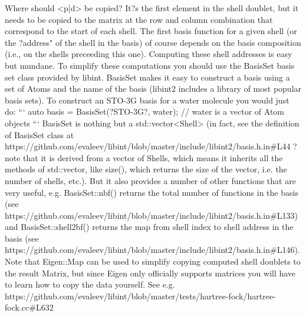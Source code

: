 \documentclass[11pt, oneside]{article}   	%
\begin{document}
Where should <p|d> be copied? It?s the first element in the shell doublet, but it needs to be copied to the matrix at the row and column combination that correspond to the start of each shell. The first basis function for a given shell (or the ?address" of the shell in the basis) of course depends on the basis composition (i.e., on the shells preceeding this one). Computing these shell addresses is easy but mundane. To simplify these computations you should use the BasisSet basis set class provided by libint.
BasisSet makes it easy to construct a basis using a set of Atoms and the name of the basis (libint2 includes a library of most popular basis sets). To construct an STO-3G basis for a water molecule you would just do:
```
auto basis = BasisSet(?STO-3G?, water);  // water is a vector of Atom objects
```
BasisSet is nothing but a std::vector<Shell> (in fact, see the definition of BasisSet class at https://github.com/evaleev/libint/blob/master/include/libint2/basis.h.in\#L44  ? note that it is derived from a vector of Shells, which means it inherits all the methods of std::vector, like size(), which returns the size of the vector, i.e. the number of shells, etc.). But it also provides a number of other functions that are very useful, e.g. BasisSet::nbf() returns the total number of functions in the basis (see https://github.com/evaleev/libint/blob/master/include/libint2/basis.h.in\#L133) and BasisSet::shell2bf() returns the map from shell index to shell address in the basis (see https://github.com/evaleev/libint/blob/master/include/libint2/basis.h.in\#L146).
Note that Eigen::Map can be used to simplify copying computed shell doublets to the result Matrix, but since Eigen only officially supports matrices you will have to learn how to copy the data yourself. See e.g. https://github.com/evaleev/libint/blob/master/tests/hartree-fock/hartree-fock.cc\#L632
\end{document}
